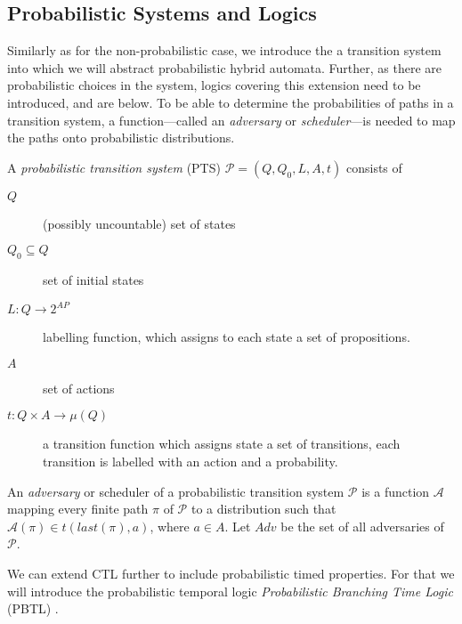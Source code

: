 \subsection{Probabilistic Systems and Logics}
Similarly as for the non-probabilistic case, we introduce the a transition system into which we will abstract probabilistic hybrid automata. Further, as there are probabilistic choices in the system, logics covering this extension need to be introduced, and are below. To be able to determine the probabilities of paths in a transition system, a function---called an \emph{adversary} or \emph{scheduler}---is needed to map the paths onto probabilistic distributions.

\begin{defi}[PTS]
A \emph{probabilistic transition system} (PTS) $\mathcal{P}=(Q,Q_{0},L,A,t)$
consists of
\begin{description}
    \item[$Q$] (possibly uncountable) set of states
    \item[$Q_{0}\subseteq Q$] set of initial states
    \item[$L:Q\rightarrow 2^{AP}$] labelling function, which assigns to each state a set of propositions.
    \item[$A$] set of actions
    \item[$t:Q\times A\rightarrow \mu(Q)$] a transition function which assigns state a set of transitions, each transition is labelled with an action and a probability.
\end{description}
\end{defi}


\begin{defi}[Adversary]
An \emph{adversary} or scheduler of a probabilistic transition system $\mathcal{P}$ is a function $\mathcal{A}$ mapping every finite path $\pi$ of $\mathcal{P}$ to a distribution such that $\mathcal{A}(\pi)\in t(last(\pi),a)$, where $a\in A$. Let $Adv$ be the set of all adversaries of $\mathcal{P}$.
\end{defi}


We can extend CTL further to include probabilistic timed properties. For that we will introduce the probabilistic temporal logic \emph{Probabilistic Branching Time Logic} (PBTL) \cite{Baier1998}.

